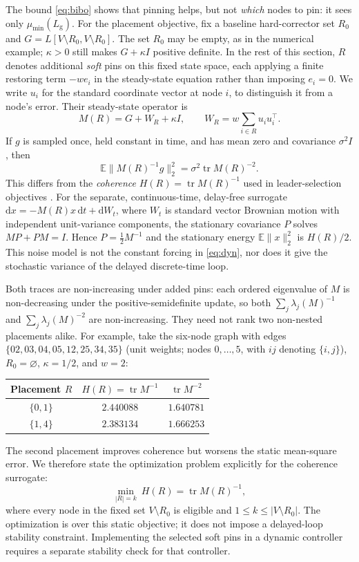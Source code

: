 \documentclass[11pt]{article}
\theoremstyle{definition}
\newcommand{\Lg}{L_{\mathrm g}}
\DeclareMathOperator{\tr}{tr}
\begin{document}
The bound \eqref{eq:bibo} shows that pinning helps, but not \emph{which} nodes to pin: it sees only
$\mu_{\min}(\Lg)$. For the placement objective, fix a baseline hard-corrector set $R_0$ and
$G=L[V\setminus R_0,V\setminus R_0]$. The set $R_0$ may be empty, as in the numerical example;
$\kappa>0$ still makes $G+\kappa I$ positive definite. In the rest of this section, $R$ denotes
additional \emph{soft} pins on this fixed state space, each applying a finite restoring term
$-w e_i$ in the steady-state equation rather than imposing $e_i=0$. We write $u_i$ for the
standard coordinate vector at node $i$, to distinguish it from a node's error. Their steady-state
operator is
\begin{equation}\label{eq:Mop}
  M(R)=G+W_R+\kappa I,\qquad W_R=w\sum_{i\in R}u_iu_i^\top .
\end{equation}
If $g$ is sampled once, held constant in time, and has mean zero and covariance $\sigma^2 I$, then
\[
  \mathbb E\|M(R)^{-1}g\|_2^2=\sigma^2\tr M(R)^{-2}.
\]
This differs from the \emph{coherence} $H(R)=\tr M(R)^{-1}$ used in leader-selection objectives
\cite{ClarkSubmod,MackinPatterson}. For the separate, continuous-time, delay-free surrogate
$\mathrm dx=-M(R)x\,\mathrm dt+\mathrm dW_t$, where $W_t$ is standard vector Brownian motion
with independent unit-variance components, the stationary covariance $P$ solves
$M P+P M=I$. Hence $P=\tfrac12 M^{-1}$ and the stationary energy $\mathbb E\|x\|_2^2$ is $H(R)/2$.
This noise model is not the constant forcing in \eqref{eq:dyn}, nor does it give the stochastic
variance of the delayed discrete-time loop.

Both traces are non-increasing under added pins: each ordered eigenvalue of $M$ is
non-decreasing under the positive-semidefinite update, so both $\sum_j\lambda_j(M)^{-1}$
and $\sum_j\lambda_j(M)^{-2}$ are non-increasing. They need not rank two non-nested placements alike.
For example, take the six-node graph with edges
$\{02,03,04,05,12,25,34,35\}$ (unit weights; nodes $0,\ldots,5$, with $ij$ denoting
$\{i,j\}$), $R_0=\varnothing$, $\kappa=1/2$, and $w=2$:
\begin{center}
\begin{tabular}{c|cc}
Placement $R$ & $H(R)=\tr M^{-1}$ & $\tr M^{-2}$\\\hline
$\{0,1\}$ & $2.440088$ & $1.640781$\\
$\{1,4\}$ & $2.383134$ & $1.666253$
\end{tabular}
\end{center}
The second placement improves coherence but worsens the static mean-square error. We therefore
state the optimization problem explicitly for the coherence surrogate:
\begin{equation}\label{eq:placeprob}
  \min_{|R|=k}\ H(R)=\tr M(R)^{-1},
\end{equation}
where every node in the fixed set $V\setminus R_0$ is eligible and $1\le k\le |V\setminus R_0|$.
The optimization is over this static objective; it does not impose a delayed-loop stability
constraint. Implementing the selected soft pins in a dynamic controller requires a separate
stability check for that controller.
\end{document}
